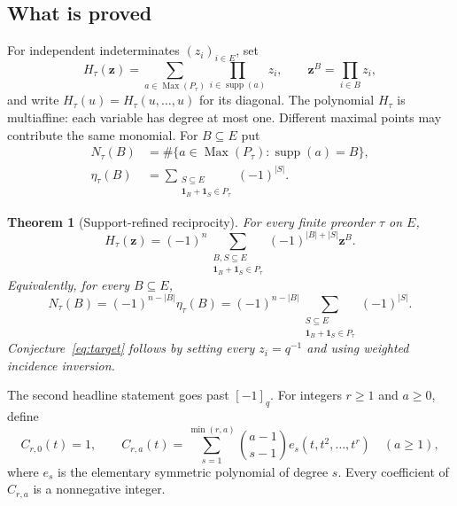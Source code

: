\documentclass[11pt]{article}
\numberwithin{equation}{section}
\newtheorem{theorem}{Theorem}[section]
\theoremstyle{definition}
\theoremstyle{remark}
\newcommand{\one}{\mathbf 1}
\newcommand{\supp}{\operatorname{supp}}
\newcommand{\Max}{\operatorname{Max}}
\newcommand{\qint}[1]{[#1]_q}
\newcommand{\zt}[1]{\mathbf z^{#1}}
\begin{document}
\subsection{What is proved}
\label{sec:whatisproved}

For independent indeterminates $(z_i)_{i\in E}$, set
\begin{equation}
 H_\tau(\mathbf z)
 =\sum_{a\in\Max(P_\tau)}\prod_{i\in\supp(a)}z_i,
 \qquad \zt B=\prod_{i\in B}z_i,
 \label{eq:support-poly}
\end{equation}
and write $H_\tau(u)=H_\tau(u,\ldots,u)$ for its diagonal. The polynomial
$H_\tau$ is multiaffine: each variable has degree at most one. Different
maximal points may contribute the same monomial. For $B\subseteq E$ put
\begin{align}
 N_\tau(B)&=\#\{a\in\Max(P_\tau):\supp(a)=B\},
 \label{eq:N-def}\\
 \eta_\tau(B)&=\sum_{\substack{S\subseteq E\\\one_B+\one_S\in P_\tau}}
                 (-1)^{|S|}.
 \label{eq:eta-def}
\end{align}

\begin{theorem}[Support-refined reciprocity]
\label{thm:main}
For every finite preorder $\tau$ on $E$,
\begin{equation}
 H_\tau(\mathbf z)
 =(-1)^n
 \sum_{\substack{B,S\subseteq E\\ \one_B+\one_S\in P_\tau}}
 (-1)^{|B|+|S|}\zt B.
 \label{eq:main}
\end{equation}
Equivalently, for every $B\subseteq E$,
\begin{equation}
 N_\tau(B)=(-1)^{n-|B|}\eta_\tau(B)
 =(-1)^{n-|B|}
 \sum_{\substack{S\subseteq E\\\one_B+\one_S\in P_\tau}}(-1)^{|S|}.
 \label{eq:exact-support}
\end{equation}
Conjecture~\eqref{eq:target} follows by setting every $z_i=q^{-1}$ and using
weighted incidence inversion.
\end{theorem}

The second headline statement goes past $\qint{-1}$. For integers $r\ge1$ and
$a\ge0$, define
\begin{equation}
 C_{r,0}(t)=1,\qquad
 C_{r,a}(t)=\sum_{s=1}^{\min(r,a)}
 \binom{a-1}{s-1}e_s(t,t^2,\ldots,t^r)\quad(a\ge1),
 \label{eq:Cdefinition}
\end{equation}
where $e_s$ is the elementary symmetric polynomial of degree $s$. Every
coefficient of $C_{r,a}$ is a nonnegative integer.
\end{document}
